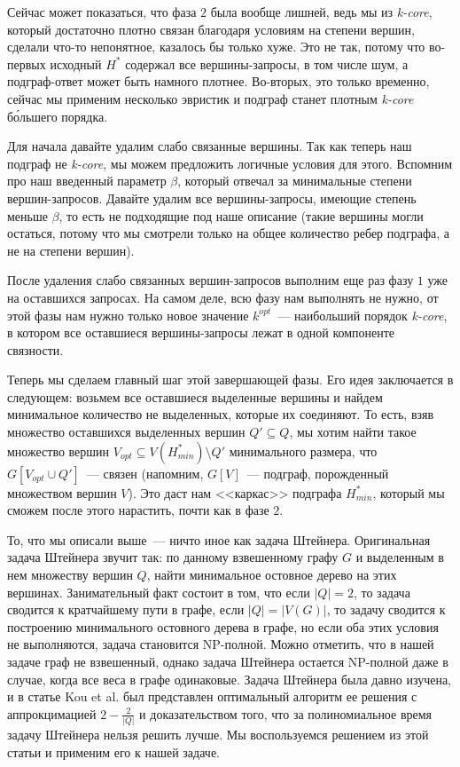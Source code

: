 \documentclass[11pt,a4paper,oneside]{article}
\begin{document}
Сейчас может показаться, что фаза $2$ была вообще лишней, ведь мы из \textit{k-core}, который достаточно плотно связан благодаря условиям на степени вершин, сделали что-то непонятное, казалось бы только хуже. Это не так, потому что во-первых исходный $H^*$ содержал все вершины-запросы, в том числе шум, а подграф-ответ может быть намного плотнее. Во-вторых, это только временно, сейчас мы применим несколько эвристик и подграф станет плотным \textit{k-core} б\'{о}льшего порядка.

Для начала давайте удалим слабо связанные вершины. Так как теперь наш подграф не \textit{k-core}, мы можем предложить логичные условия для этого. Вспомним про наш введенный параметр $\beta$, который отвечал за минимальные степени вершин-запросов. Давайте удалим все вершины-запросы, имеющие степень меньше $\beta$, то есть не подходящие под наше описание (такие вершины могли остаться, потому что мы смотрели только на общее количество ребер подграфа, а не на степени вершин).

После удаления слабо связанных вершин-запросов выполним еще раз фазу $1$ уже на оставшихся запросах. На самом деле, всю фазу нам выполнять не нужно, от этой фазы нам нужно только новое значение $k^{opt}$~--- наибольший порядок \textit{k-core}, в котором все оставшиеся вершины-запросы лежат в одной компоненте связности.

Теперь мы сделаем главный шаг этой завершающей фазы. Его идея заключается в следующем: возьмем все оставшиеся выделенные вершины и найдем минимальное количество не выделенных, которые их соединяют. То есть, взяв множество оставшихся выделенных вершин $Q' \subseteq Q$, мы хотим найти такое множество вершин $V_{opt} \subseteq V(H_{min}^*) \setminus Q'$ минимального размера, что $G[V_{opt} \cup Q']$~--- связен (напомним, $G[V]$~--- подграф, порожденный множеством вершин $V$). Это даст нам <<каркас>> подграфа $H_{min}^*$, который мы сможем после этого нарастить, почти как в фазе $2$.

То, что мы описали выше~--- ничто иное как задача Штейнера. Оригинальная задача Штейнера звучит так: по данному взвешенному графу $G$ и выделенным в нем множеству вершин $Q$, найти минимальное остовное дерево на этих вершинах. Занимательный факт состоит в том, что если $|Q| = 2$, то задача сводится к кратчайшему пути в графе, если $|Q| = |V(G)|$, то задачу сводится к построению минимального остовного дерева в графе, но если оба этих условия не выполняются, задача становится NP-полной. Можно отметить, что в нашей задаче граф не взвешенный, однако задача Штейнера остается NP-полной даже в случае, когда все веса в графе одинаковые. Задача Штейнера была давно изучена, и в статье Kou et al. \cite{Kou81} был представлен оптимальный алгоритм ее решения с аппрокцимацией $2 - \frac{2}{|Q|}$ и доказательством того, что за полиномиальное время задачу Штейнера нельзя решить лучше. Мы воспользуемся решением из этой статьи и применим его к нашей задаче.
\end{document}
